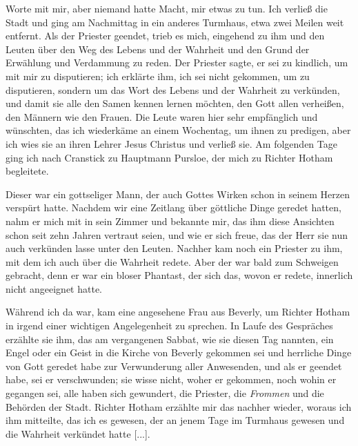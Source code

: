 Worte mit mir, aber niemand hatte Macht, mir etwas zu tun.
Ich verließ die Stadt und ging am Nachmittag in ein anderes
Turmhaus, etwa zwei Meilen weit entfernt. Als der Priester
geendet, trieb es mich, eingehend zu ihm und den Leuten über
den Weg des Lebens und der Wahrheit und den Grund der 
Erwählung und Verdammung zu reden. Der Priester sagte, er sei
zu kindlich, um mit mir zu disputieren; ich erklärte ihm, ich sei
nicht gekommen, um zu disputieren, sondern um das Wort des
Lebens und der Wahrheit zu verkünden, und damit sie alle den
Samen kennen lernen möchten, den Gott allen verheißen, den
Männern wie den Frauen. Die Leute waren hier sehr empfänglich
und wünschten, das ich wiederkäme an einem Wochentag, um
ihnen zu predigen, aber ich wies sie an ihren Lehrer Jesus
Christus und verließ sie. Am folgenden Tage ging ich nach
Cranstick zu Hauptmann Pursloe, der mich zu Richter 
Hotham
begleitete. 

Dieser war ein gottseliger Mann, der auch Gottes
Wirken schon in seinem Herzen verspürt hatte. Nachdem wir eine
Zeitlang über göttliche Dinge geredet hatten, nahm er mich mit
in sein Zimmer und bekannte mir, das ihm diese Ansichten
schon seit zehn Jahren vertraut seien, und wie er sich freue, das
der Herr sie nun auch verkünden lasse unter den Leuten. 
Nachher kam noch ein Priester zu ihm, mit dem ich auch über die
Wahrheit redete. Aber der war bald zum Schweigen gebracht,
denn er war ein bloser Phantast, der sich das, wovon er redete,
innerlich nicht angeeignet hatte.


Während ich da war, kam eine angesehene Frau aus Beverly,
um Richter Hotham in irgend einer wichtigen Angelegenheit zu
sprechen. In Laufe des Gespräches erzählte sie ihm, das am
vergangenen Sabbat, wie sie diesen Tag nannten, ein Engel oder
ein Geist in die Kirche von Beverly gekommen sei und herrliche
Dinge von Gott geredet habe zur Verwunderung aller Anwesenden,
und als er geendet habe, sei er verschwunden; sie wisse nicht, woher
er gekommen, noch wohin er gegangen sei, alle haben sich 
gewundert, die Priester, die \textit{Frommen} 
und die Behörden der Stadt.
Richter Hotham erzählte mir das nachher wieder, woraus ich ihm
mitteilte, das ich es gewesen, der an jenem Tage im Turmhaus
gewesen und die Wahrheit verkündet hatte [...].

